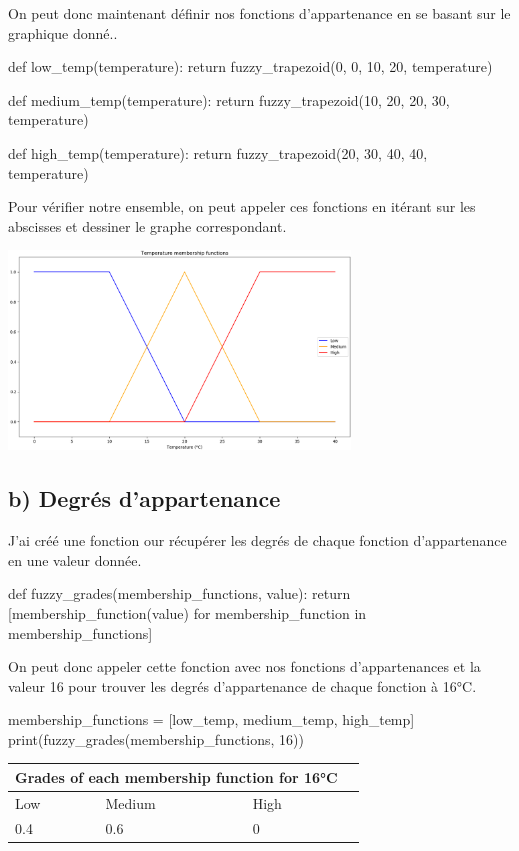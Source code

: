 \documentclass[11pt]{report}
\begin{document}
On peut donc maintenant définir nos fonctions d'appartenance en se basant sur le graphique donné..
\begin{pythoncode}
def low_temp(temperature):
	return fuzzy_trapezoid(0, 0, 10, 20, temperature)

def medium_temp(temperature):
	return fuzzy_trapezoid(10, 20, 20, 30, temperature)

def high_temp(temperature):
	return fuzzy_trapezoid(20, 30, 40, 40, temperature)
\end{pythoncode}

Pour vérifier notre ensemble, on peut appeler ces fonctions en itérant sur les abscisses et dessiner le graphe correspondant.
\begin{center}
	\includegraphics[height=200px]{membership_functions}
\end{center}


\subsection*{b) Degrés d'appartenance}
J'ai créé une fonction our récupérer les degrés de chaque fonction d'appartenance en une valeur donnée.
\begin{pythoncode}
def fuzzy_grades(membership_functions, value):
	return [membership_function(value) for membership_function in membership_functions]
\end{pythoncode}

On peut donc appeler cette fonction avec nos fonctions d'appartenances et la valeur 16 pour trouver les degrés d'appartenance de chaque fonction à 16°C.
\begin{pythoncode}
membership_functions = [low_temp, medium_temp, high_temp]
print(fuzzy_grades(membership_functions, 16))
\end{pythoncode}

\begin{center}
	\begin{tabularx}{0.5\linewidth}{|*{4}{X|}}
		\multicolumn{3}{c}{Grades of each membership function for 16°C}\\
	\hline
		Low & Medium & High\\
	\hline
		0.4 & 0.6 & 0\\
	\hline
	\end{tabularx}
\end{center}
\end{document}
